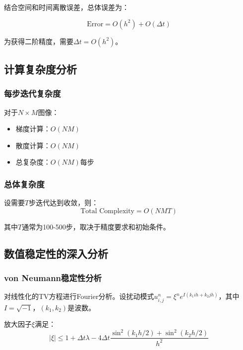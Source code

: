 \documentclass[a4paper,12pt]{ctexart}
\begin{document}
结合空间和时间离散误差，总体误差为：

\begin{equation}
\text{Error} = O(h^2) + O(\Delta t)
\end{equation}

为获得二阶精度，需要$\Delta t = O(h^2)$。

\subsection{计算复杂度分析}

\subsubsection{每步迭代复杂度}

对于$N \times M$图像：
\begin{itemize}
    \item 梯度计算：$O(NM)$
    \item 散度计算：$O(NM)$  
    \item 总复杂度：$O(NM)$每步
\end{itemize}

\subsubsection{总体复杂度}

设需要$T$步迭代达到收敛，则：
\begin{equation}
\text{Total Complexity} = O(NMT)
\end{equation}

其中$T$通常为100-500步，取决于精度要求和初始条件。

\subsection{数值稳定性的深入分析}

\subsubsection{von Neumann稳定性分析}

对线性化的TV方程进行Fourier分析。设扰动模式$u_{i,j}^n = \xi^n e^{I(k_1 i h + k_2 j h)}$，其中$I = \sqrt{-1}$，$(k_1, k_2)$是波数。

放大因子$\xi$满足：
\begin{equation}
|\xi| \leq 1 + \Delta t \lambda - 4\Delta t \frac{\sin^2(k_1 h/2) + \sin^2(k_2 h/2)}{h^2}
\end{equation}
\end{document}
